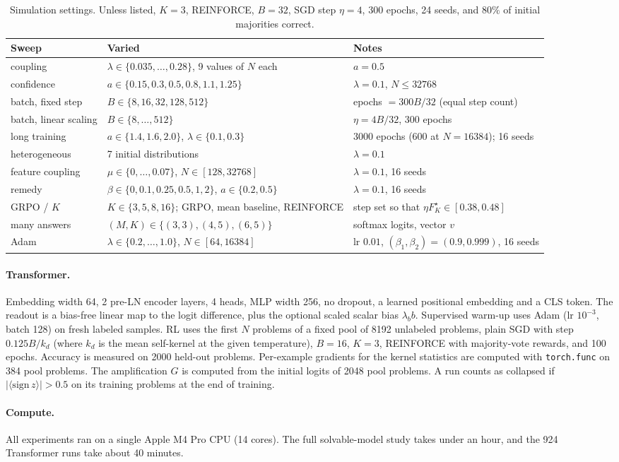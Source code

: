 \begin{table}[h]
\centering\small
\caption{Simulation settings. Unless listed, $K{=}3$, REINFORCE, $B{=}32$, SGD step $\eta{=}4$, 300 epochs, 24 seeds, and $80\%$ of initial majorities correct.}
\label{tab:hparams}
\begin{tabular}{lll}
\toprule
Sweep & Varied & Notes \\
\midrule
coupling & $\lambda\in\{0.035,\dots,0.28\}$, 9 values of $N$ each & $a=0.5$ \\
confidence & $a\in\{0.15,0.3,0.5,0.8,1.1,1.25\}$ & $\lambda=0.1$, $N\le32768$ \\
batch, fixed step & $B\in\{8,16,32,128,512\}$ & epochs $=300B/32$ (equal step count) \\
batch, linear scaling & $B\in\{8,\dots,512\}$ & $\eta=4B/32$, 300 epochs \\
long training & $a\in\{1.4,1.6,2.0\}$, $\lambda\in\{0.1,0.3\}$ & 3000 epochs (600 at $N=16384$); 16 seeds \\
heterogeneous & 7 initial distributions & $\lambda=0.1$ \\
feature coupling & $\mu\in\{0,\dots,0.07\}$, $N\in[128,32768]$ & $\lambda=0.1$, 16 seeds \\
remedy & $\beta\in\{0,0.1,0.25,0.5,1,2\}$, $a\in\{0.2,0.5\}$ & $\lambda=0.1$, 16 seeds \\
GRPO / $K$ & $K\in\{3,5,8,16\}$; GRPO, mean baseline, REINFORCE & step set so that $\eta F^\star_K\in[0.38,0.48]$ \\
many answers & $(M,K)\in\{(3,3),(4,5),(6,5)\}$ & softmax logits, vector $v$ \\
Adam & $\lambda\in\{0.2,\dots,1.0\}$, $N\in[64,16384]$ & lr $0.01$, $(\beta_1,\beta_2)=(0.9,0.999)$, 16 seeds \\
\bottomrule
\end{tabular}
\end{table}

\paragraph{Transformer.}
Embedding width 64, 2 pre-LN encoder layers, 4 heads, MLP width 256, no dropout, a learned positional embedding and a CLS token. The readout is a bias-free linear map to the logit difference, plus the optional scaled scalar bias $\lambda_bb$.
Supervised warm-up uses Adam (lr $10^{-3}$, batch 128) on fresh labeled samples.
RL uses the first $N$ problems of a fixed pool of 8192 unlabeled problems, plain SGD with step $0.125B/k_d$ (where $k_d$ is the mean self-kernel at the given temperature), $B=16$, $K=3$, REINFORCE with majority-vote rewards, and 100 epochs.
Accuracy is measured on 2000 held-out problems.
Per-example gradients for the kernel statistics are computed with \texttt{torch.func} on 384 pool problems.
The amplification $G$ is computed from the initial logits of 2048 pool problems.
A run counts as collapsed if $|\langle\mathrm{sign}\,z\rangle|>0.5$ on its training problems at the end of training.

\paragraph{Compute.}
All experiments ran on a single Apple M4 Pro CPU (14 cores).
The full solvable-model study takes under an hour, and the 924 Transformer runs take about 40 minutes.
